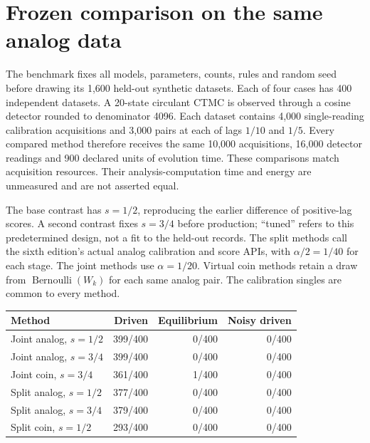 \section{Frozen comparison on the same analog data}
The benchmark fixes all models, parameters, counts, rules and random seed
before drawing its 1,600 held-out synthetic datasets. Each of four cases has
400 independent datasets. A 20-state circulant CTMC is observed through a
cosine detector rounded to denominator 4096. Each dataset contains 4,000
single-reading calibration acquisitions and 3,000 pairs at each of lags
$1/10$ and $1/5$. Every compared method therefore receives the same
10,000 acquisitions, 16,000 detector readings and 900 declared units of
evolution time.
These comparisons match acquisition resources. Their analysis-computation
time and energy are unmeasured and are not asserted equal.

The base contrast has $s=1/2$, reproducing the earlier difference of positive-lag
scores. A second contrast fixes $s=3/4$ before production; ``tuned'' refers to
this predetermined design, not a fit to the held-out records. The split methods
call the sixth edition's actual analog calibration and score APIs, with
$\alpha/2=1/40$ for each stage. The joint methods use $\alpha=1/20$. Virtual
coin methods retain a draw from $\operatorname{Bernoulli}(W_k)$ for each same
analog pair. The calibration singles are common to every method.

\begin{center}
\begin{tabular}{lrrr}
\toprule
Method & Driven & Equilibrium & Noisy driven\\
\midrule
Joint analog, $s=1/2$ &399/400&0/400&0/400\\
Joint analog, $s=3/4$ &399/400&0/400&0/400\\
Joint coin, $s=3/4$ &361/400&1/400&0/400\\
Split analog, $s=1/2$ &377/400&0/400&0/400\\
Split analog, $s=3/4$ &379/400&0/400&0/400\\
Split coin, $s=1/2$ &293/400&0/400&0/400\\
\bottomrule
\end{tabular}
\end{center}

